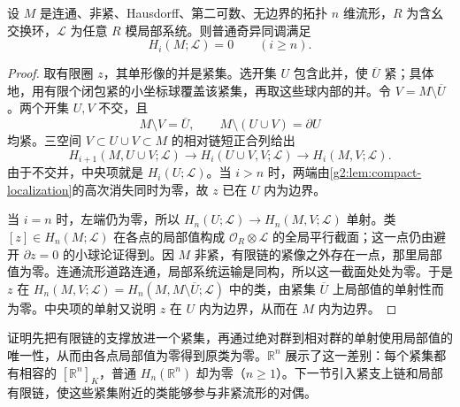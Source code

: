 \begin{proposition}\label{g2:prop:noncompact-top-homology}
	设 \(M\) 是连通、非紧、Hausdorff、第二可数、无边界的拓扑 \(n\) 维流形，\(R\) 为含幺交换环，\(\mathcal L\) 为任意 \(R\) 模局部系统。则普通奇异同调满足
	\[
		H_i(M;\mathcal L)=0\qquad(i\geq n).
	\]
\end{proposition}
\begin{proof}
	取有限圈 \(z\)，其单形像的并是紧集。选开集 \(U\) 包含此并，使 \(\overline U\) 紧；具体地，用有限个闭包紧的小坐标球覆盖该紧集，再取这些球内部的并。令 \(V=M\setminus\overline U\)。两个开集 \(U,V\) 不交，且
	\[
		M\setminus V=\overline U,\qquad
		M\setminus(U\cup V)=\partial U
	\]
	均紧。三空间 \(V\subset U\cup V\subset M\) 的相对链短正合列给出
	\[
		H_{i+1}(M,U\cup V;\mathcal L)\longrightarrow H_i(U\cup V,V;\mathcal L)
		\longrightarrow H_i(M,V;\mathcal L).
	\]
	由于不交并，中央项就是 \(H_i(U;\mathcal L)\)。当 \(i>n\) 时，两端由\cref{g2:lem:compact-localization}的高次消失同时为零，故 \(z\) 已在 \(U\) 内为边界。

	当 \(i=n\) 时，左端仍为零，所以 \(H_n(U;\mathcal L)\to H_n(M,V;\mathcal L)\) 单射。类 \([z]\in H_n(M;\mathcal L)\) 在各点的局部值构成 \(\mathcal O_R\otimes\mathcal L\) 的全局平行截面；这一点仍由避开 \(\partial z=0\) 的小球论证得到。因 \(M\) 非紧，有限链的紧像之外存在一点，那里局部值为零。连通流形道路连通，局部系统运输是同构，所以这一截面处处为零。于是 \(z\) 在 \(H_n(M,V;\mathcal L)=H_n(M,M\setminus\overline U;\mathcal L)\) 中的类，由紧集 \(\overline U\) 上局部值的单射性而为零。中央项的单射又说明 \(z\) 在 \(U\) 内为边界，从而在 \(M\) 内为边界。
\end{proof}

证明先把有限链的支撑放进一个紧集，再通过绝对群到相对群的单射使用局部值的唯一性，从而由各点局部值为零得到原类为零。\(\mathbb R^n\) 展示了这一差别：每个紧集都有相容的 \([\mathbb R^n]_K\)，普通 \(H_n(\mathbb R^n)\) 却为零（\(n\geq1\)）。下一节引入紧支上链和局部有限链，使这些紧集附近的类能够参与非紧流形的对偶。
